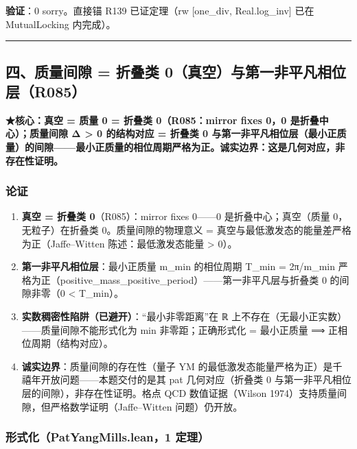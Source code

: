 \documentclass[
]{article}
\providecommand{\tightlist}{%
 \setlength{\itemsep}{0pt}\setlength{\parskip}{0pt}}
\begin{document}
\textbf{验证}：0 sorry。直接锚 R139 已证定理（rw {[}one\_div,
Real.log\_inv{]} 已在 MutualLocking 内完成）。

\begin{center}\rule{0.5\linewidth}{0.5pt}\end{center}

\subsection{四、质量间隙 = 折叠类
0（真空）与第一非平凡相位层（R085）}\label{ux56dbux8d28ux91cfux95f4ux9699-ux6298ux53e0ux7c7b-0ux771fux7a7aux4e0eux7b2cux4e00ux975eux5e73ux51e1ux76f8ux4f4dux5c42r085}

\textbf{★核心：真空 = 质量 0 = 折叠类 0（R085：mirror fixes 0，0
是折叠中心）；质量间隙 Δ \textgreater{} 0 的结构对应 = 折叠类 0
与第一非平凡相位层（最小正质量）的间隙------最小正质量的相位周期严格为正。诚实边界：这是几何对应，非存在性证明。}

\subsubsection{论证}\label{ux8bbaux8bc1-3}

\begin{enumerate}
\def\labelenumi{\arabic{enumi}.}
\tightlist
\item
 \textbf{真空 = 折叠类 0}（R085）：mirror fixes 0------0
 是折叠中心；真空（质量 0，无粒子）在折叠类 0。质量间隙的物理意义 =
 真空与最低激发态的能量差严格为正（Jaffe--Witten 陈述：最低激发态能量
 \textgreater{} 0）。
\item
 \textbf{第一非平凡相位层}：最小正质量 m\_min 的相位周期 T\_min =
 2π/m\_min
 严格为正（positive\_mass\_positive\_period）------第一非平凡层与折叠类
 0 的间隙非零（0 \textless{} T\_min）。
\item
 \textbf{实数稠密性陷阱（已避开）}：``最小非零距离''在 ℝ
 上不存在（无最小正实数）------质量间隙不能形式化为 min
 非零距；正确形式化 = 最小正质量 ⟹ 正相位周期（结构对应）。
\item
 \textbf{诚实边界}：质量间隙的存在性（量子 YM
 的最低激发态能量严格为正）是千禧年开放问题------本题交付的是其 pat
 几何对应（折叠类 0 与第一非平凡相位层的间隙），非存在性证明。格点 QCD
 数值证据（Wilson 1974）支持质量间隙，但严格数学证明（Jaffe--Witten
 问题）仍开放。
\end{enumerate}

\subsubsection{形式化（PatYangMills.lean，1
定理）}\label{ux5f62ux5f0fux5316patyangmills.lean1-ux5b9aux7406-2}
\end{document}
